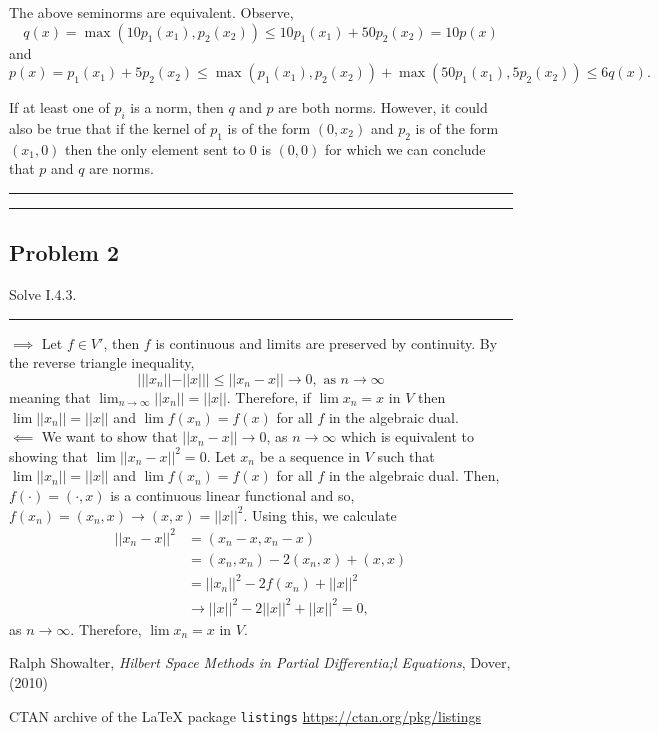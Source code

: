 \documentclass[12pt]{amsart}
\begin{document}
The above seminorms are equivalent. Observe,
	\[ q(x) = \max(10p_1(x_1), p_2(x_2))\leq 10p_1(x_1) + 50p_2(x_2) = 10p(x) \]
and 
	\[p(x) = p_1(x_1) + 5p_2(x_2) \leq \max(p_1(x_1),p_2(x_2)) + \max(50p_1(x_1),5p_2(x_2)) \leq 6q(x).\]

If at least one of $p_i$ is a norm, then $q$ and $p$ are both norms. However, it could also be true that if the kernel of $p_1$ is of the form $(0,x_2)$ and  $p_2$ is of the form $(x_1,0)$ then the only element sent to 0 is $(0,0)$ for which we can conclude that $p$ and $q$ are norms.\\


\medskip
\hrule
\hrule
\medskip
\subsection*{Problem 2}
Solve I.4.3.
\\
\medskip
\hrule
\medskip
%

$\implies$ Let $f\in V'$, then $f$ is continuous and limits are preserved by continuity. By the reverse triangle inequality,
	\[| || x_n || - || x || | \leq || x_n - x || \to 0, \text{ as } n\to \infty\]
meaning that $\lim_{n\to\infty} ||x_n|| = ||x||$. Therefore, if $\lim x_n = x$ in $V$ then $\lim || x_n || = || x || $ and $\lim f(x_n) = f(x) $ for all $f$ in the algebraic dual.\\

$\impliedby$ We want to show that $|| x_n - x || \to 0$, as $n\to \infty$ which is equivalent to showing that $\lim || x_n - x ||^2 = 0$. Let $x_n$ be a sequence in $V$ such that $\lim || x_n || = || x || $ and $\lim f(x_n) = f(x) $ for all $f$ in the algebraic dual. Then, $f(\cdot) = ( \cdot, x)$ is a continuous linear functional and so, $f(x_n) = (x_n, x) \to (x, x) = || x || ^2$. Using this, we calculate
	\begin{align*}
		|| x_n - x || ^ 2 & = (x_n - x, x_n -x) \\
				      & = (x_n, x_n) - 2(x_n, x) + (x,x)\\
				      & = || x_n || ^2 - 2f(x_n) + || x|| ^2\\
				      & \to || x || ^2 - 2||x||^2 + || x|| ^2 = 0,
	\end{align*}
as $n\to \infty$. Therefore, $\lim x_n = x$ in $V$.
\begin{thebibliography}{9}
 Ralph Showalter, \emph{Hilbert Space Methods in Partial Differentia;l Equations}, Dover, (2010)

 CTAN archive of the LaTeX package {\tt listings} \url{https://ctan.org/pkg/listings}
\end{thebibliography}
\end{document}

